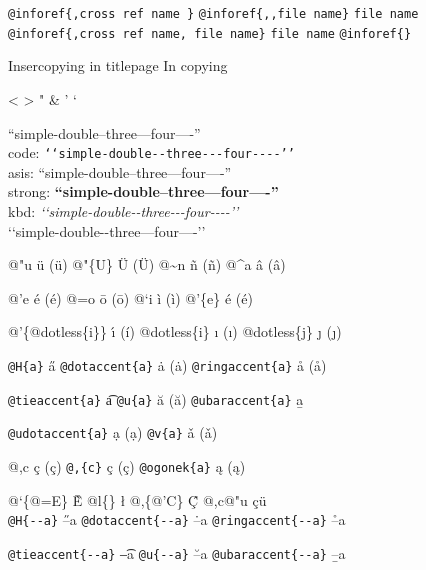 \documentclass{book}
\newcommand\Texinfocommandstyletextkbd[1]{{\ttfamily\textsl{#1}}}%
\renewcommand{\_}{\Texinfounderscore\discretionary{}{}{}}
\begin{document}
\begin{titlepage}
\texttt{@inforef\{,cross ref name \}} 
\texttt{@inforef\{{,}{,}file name\}} \texttt{file name}
\texttt{@inforef\{,cross ref name,\ file name\}} \texttt{file name}
\texttt{@inforef\{\}} 



Insercopying in titlepage
In copying

<
>
"
\&
'
`

``simple-double--three---four----''\leavevmode{}\\
code: \texttt{{`}{`}simple-double{-}{-}three{-}{-}{-}four{-}{-}{-}-{'}{'}} \leavevmode{}\\
asis: ``simple-double--three---four----'' \leavevmode{}\\
strong: \textbf{``simple-double--three---four----''} \leavevmode{}\\
kbd: \Texinfocommandstyletextkbd{{`}{`}simple-double{-}{-}three{-}{-}{-}four{-}{-}{-}-{'}{'}} \leavevmode{}\\

`\hbox{}`simple-double-\hbox{}-three---four----'\hbox{}'\leavevmode{}\\

%
%
%
%

@"u \"{u} (ü)
@"\{U\} \"{U} (Ü) 
@\~{}n \~{n} (ñ)
@\^{}a \^{a} (â)

@'e \'{e} (é)
@=o \={o} (ō)
@`i \`{i} (ì)
@'\{e\} \'{e} (é)

@'\{@dotless\{i\}\} \'{\i{}} (í)
@dotless\{i\} \i{} (ı)
@dotless\{j\} \j{} (ȷ)

\texttt{@H\{a\}} \H{a}
\texttt{@dotaccent\{a\}} \.{a} (ȧ)
\texttt{@ringaccent\{a\}} \r{a} (å)

\texttt{@tieaccent\{a\}} \t{a}
\texttt{@u\{a\}} \u{a} (ă)
\texttt{@ubaraccent\{a\}} \b{a}

\texttt{@udotaccent\{a\}} \d{a} (ạ)
\texttt{@v\{a\}} \v{a} (ǎ)

@,c \c{c} (ç)
\texttt{@,\{c\}} \c{c} (ç)
\texttt{@ogonek\{a\}} \k{a} (ą)

@`\{@=E\} \`{\={E}}
@l\{\} \l{}
@,\{@'C\} \c{\'{C}}
@,c@"u \c{c}\"{u} \leavevmode{}\\

\texttt{@H\{{-}{-}a\}} \H{--a}
\texttt{@dotaccent\{{-}{-}a\}} \.{--a}
\texttt{@ringaccent\{{-}{-}a\}} \r{--a}

\texttt{@tieaccent\{{-}{-}a\}} \t{--a}
\texttt{@u\{{-}{-}a\}} \u{--a}
\texttt{@ubaraccent\{{-}{-}a\}} \b{--a}


\end{titlepage}
\end{document}
